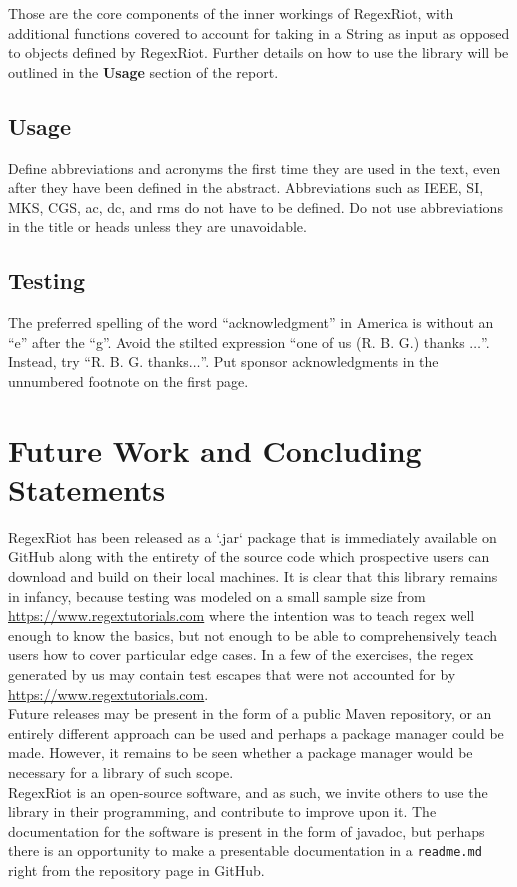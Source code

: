 \documentclass[conference]{IEEEtran}
\begin{document}
Those are the core components of the inner workings of RegexRiot, 
with additional functions covered to account for taking in a String 
as input as opposed to objects defined by RegexRiot. 
Further details on how to use the library will be outlined in 
the \textbf{Usage} section of the report.

\subsection{Usage}\label{AA}
Define abbreviations and acronyms the first time they are used in the text,
even after they have been defined in the abstract. Abbreviations such as
IEEE, SI, MKS, CGS, ac, dc, and rms do not have to be defined. Do not use
abbreviations in the title or heads unless they are unavoidable.


\subsection{Testing}

The preferred spelling of the word ``acknowledgment'' in America is without
an ``e'' after the ``g''. Avoid the stilted expression ``one of us (R. B.
G.) thanks $\ldots$''. Instead, try ``R. B. G. thanks$\ldots$''. Put sponsor
acknowledgments in the unnumbered footnote on the first page.

\section{Future Work and Concluding Statements}

RegexRiot has been released as a `.jar` package that is immediately available 
on GitHub along with the entirety of the source code which prospective users 
can download and build on their local machines. It is clear that this library 
remains in infancy, because testing was modeled on a small sample size from 
\url{https://www.regextutorials.com} where the intention was to 
teach regex well enough to know the basics, but not enough to be able to 
comprehensively teach users how to cover particular edge cases. 
In a few of the exercises, the regex generated by us may contain test escapes 
that were not accounted for by \url{https://www.regextutorials.com}.
\\
Future releases may be present in the form of a public Maven repository, 
or an entirely different approach can be used and perhaps a package manager 
could be made. However, it remains to be seen whether a package manager would 
be necessary for a library of such scope.
\\
RegexRiot is an open-source software, and as such, we invite others to use the library 
in their programming, and contribute to improve upon it. The documentation for 
the software is present in the form of javadoc, but perhaps there is an 
opportunity to make a presentable documentation in a \texttt{readme.md} 
right from the repository page in GitHub.
\end{document}
